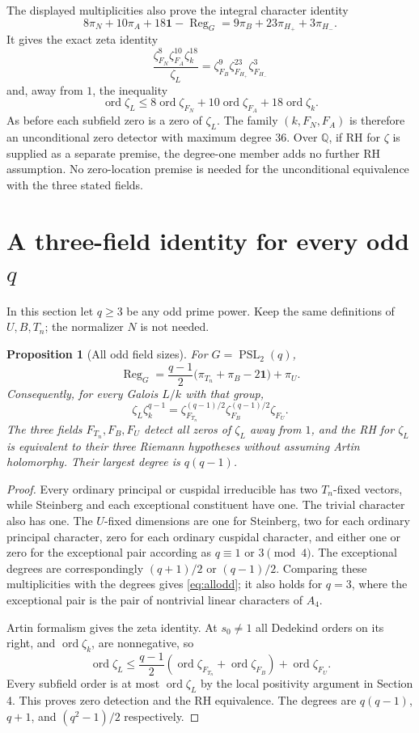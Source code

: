 \documentclass[11pt]{article}
\newtheorem{proposition}[theorem]{Proposition}
\theoremstyle{remark}\newtheorem{remark}[theorem]{Remark}
\newcommand{\Reg}{\operatorname{Reg}}
\newcommand{\ord}{\operatorname{ord}}
\newcommand{\PSL}{\operatorname{PSL}}
\newcommand{\Q}{\mathbb Q}
\newcommand{\one}{\mathbf 1}
\begin{document}
The displayed multiplicities also prove the integral character identity
\begin{equation}\label{eq:q9}
 8\pi_N+10\pi_A+18\one-\Reg_G
 =9\pi_B+23\pi_{H_+}+3\pi_{H_-}.
\end{equation}
It gives the exact zeta identity
\[
 \frac{\zeta_{F_N}^{8}\zeta_{F_A}^{10}\zeta_k^{18}}{\zeta_L}
 =\zeta_{F_B}^{9}\zeta_{F_{H_+}}^{23}\zeta_{F_{H_-}}^{3}
\]
and, away from $1$, the inequality
\[
 \ord\zeta_L\le8\ord\zeta_{F_N}+10\ord\zeta_{F_A}+18\ord\zeta_k.
\]
As before each subfield zero is a zero of $\zeta_L$. The family
$(k,F_N,F_A)$ is therefore an unconditional zero detector with maximum
degree $36$. Over $\Q$, if RH for $\zeta$ is supplied as a separate
premise, the degree-one member adds no further RH assumption.
No zero-location premise is needed for the unconditional equivalence
with the three stated fields.

\section{A three-field identity for every odd \texorpdfstring{$q$}{q}}
In this section let $q\ge3$ be any odd prime power. Keep the same
definitions of $U,B,T_n$; the normalizer $N$ is not needed.

\begin{proposition}[All odd field sizes]\label{prop:allodd}
For $G=\PSL_2(q)$,
\begin{equation}\label{eq:allodd}
 \Reg_G=\frac{q-1}2\bigl(\pi_{T_n}+\pi_B-2\one\bigr)+\pi_U.
\end{equation}
Consequently, for every Galois $L/k$ with that group,
\[
 \zeta_L\zeta_k^{q-1}
 =\zeta_{F_{T_n}}^{(q-1)/2}\zeta_{F_B}^{(q-1)/2}\zeta_{F_U}.
\]
The three fields $F_{T_n},F_B,F_U$ detect all zeros of $\zeta_L$
away from $1$, and the RH for $\zeta_L$ is equivalent to their three
Riemann hypotheses without assuming Artin holomorphy. Their largest
degree is $q(q-1)$.
\end{proposition}
\begin{proof}
Every ordinary principal or cuspidal irreducible has two $T_n$-fixed
vectors, while Steinberg and each exceptional constituent have one.
The trivial character also has one. The $U$-fixed dimensions are one
for Steinberg, two for each ordinary principal character, zero for
each ordinary cuspidal character, and either one or zero for the
exceptional pair according as $q\equiv1$ or $3\pmod4$.
The exceptional degrees are correspondingly $(q+1)/2$ or $(q-1)/2$.
Comparing these multiplicities with the degrees gives
\eqref{eq:allodd}; it also holds for $q=3$, where the exceptional pair
is the pair of nontrivial linear characters of $A_4$.

Artin formalism gives the zeta identity. At $s_0\ne1$ all Dedekind
orders on its right, and $\ord\zeta_k$, are nonnegative, so
\[
 \ord\zeta_L\le\frac{q-1}2
      (\ord\zeta_{F_{T_n}}+\ord\zeta_{F_B})+\ord\zeta_{F_U}.
\]
Every subfield order is at most $\ord\zeta_L$ by the local positivity
argument in Section 4. This proves zero detection and the RH equivalence.
The degrees are $q(q-1)$, $q+1$, and $(q^2-1)/2$ respectively.
\end{proof}
\end{document}
